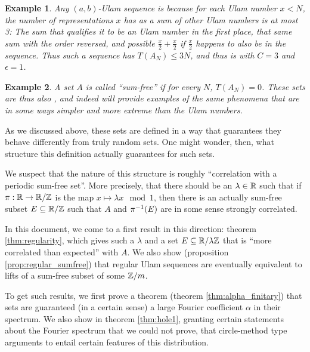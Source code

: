 \documentclass{report}
\newtheorem{example}{Example}
\theoremstyle{remark}
\numberwithin{equation}{section}
\begin{document}
\begin{example}
  Any $(a,b)$-Ulam sequence is \relevant because for each Ulam number
  $x < N$, the number of representations $x$ has as a sum of other
  Ulam numbers is at most 3: The sum that qualifies it to be an Ulam
  number in the first place, that same sum with the order reversed,
  and possible $\frac{x}{2} + \frac{x}{2}$ if $\frac{x}{2}$ happens to
  also be in the sequence.  Thus such a sequence has $T(A_N) \leq 3N$,
  and thus is \relevant with $C = 3$ and $\epsilon = 1$.
\end{example}

\begin{example}
  A set $A$ is called ``sum-free'' if for every $N$, $T(A_N) = 0$.
  These sets are thus also \relevant, and indeed will provide examples
  of the same phenomena that are in some ways simpler and more extreme
  than the Ulam numbers.
\end{example}

As we discussed above, these sets are defined in a way that guarantees
they behave differently from truly random sets.  One might wonder,
then, what structure this definition actually guarantees for such
sets.

We suspect that the nature of this structure is roughly ``correlation
with a periodic sum-free set''.  More precisely, that there should be
an $\lambda \in \mathbb{R}$ such that if $\pi : \mathbb{R} \to \mathbb{R}/\mathbb{Z}$ is the map
$x \mapsto \lambda x\mod{1}$, then there is an actually sum-free
subset $E \subseteq \mathbb{R}/\mathbb{Z}$ such that $A$ and $\pi^{-1}(E)$ are in some
sense strongly correlated.  

In this document, we come to a first result in this direction: theorem
\ref{thm:regularity}, which gives such a $\lambda$ and a set
$E \subseteq \mathbb{R}/\lambda\mathbb{Z}$ that is ``more correlated than expected''
with $A$.  We also show (proposition \ref{prop:regular_sumfree}) that
regular Ulam sequences are eventually equivalent to lifts of a
sum-free subset of some $\mathbb{Z}/m$.

To get such results, we first prove a theorem (theorem
\ref{thm:alpha_finitary}) that \relevant sets are guaranteed (in a
certain sense) a large Fourier coefficient $\alpha$ in their spectrum.
We also show in theorem \ref{thm:hole1}, granting certain statements
about the Fourier spectrum that we could not prove, that circle-method
type arguments to entail certain features of this distribution.
\end{document}
